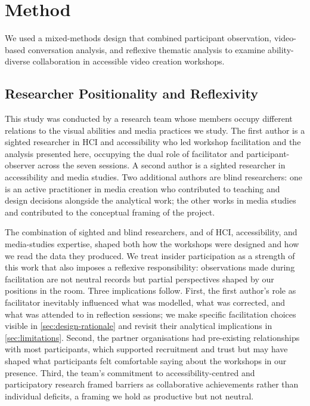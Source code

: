 \section{Method}
We used a mixed-methods design that combined participant observation, video-based conversation analysis, and reflexive thematic analysis to examine ability-diverse collaboration in accessible video creation workshops.

\subsection{Researcher Positionality and Reflexivity}
\label{sec:positionality}
This study was conducted by a research team whose members occupy different relations to the visual abilities and media practices we study. The first author is a sighted researcher in HCI and accessibility who led workshop facilitation and the analysis presented here, occupying the dual role of facilitator and participant-observer across the seven sessions. A second author is a sighted researcher in accessibility and media studies. Two additional authors are blind researchers: one is an active practitioner in media creation who contributed to teaching and design decisions alongside the analytical work; the other works in media studies and contributed to the conceptual framing of the project.

The combination of sighted and blind researchers, and of HCI, accessibility, and media-studies expertise, shaped both how the workshops were designed and how we read the data they produced. We treat insider participation as a strength of this work that also imposes a reflexive responsibility: observations made during facilitation are not neutral records but partial perspectives shaped by our positions in the room. Three implications follow. First, the first author's role as facilitator inevitably influenced what was modelled, what was corrected, and what was attended to in reflection sessions; we make specific facilitation choices visible in \autoref{sec:design-rationale} and revisit their analytical implications in \autoref{sec:limitations}. Second, the partner organisations had pre-existing relationships with most participants, which supported recruitment and trust but may have shaped what participants felt comfortable saying about the workshops in our presence. Third, the team's commitment to accessibility-centred and participatory research framed barriers as collaborative achievements rather than individual deficits, a framing we hold as productive but not neutral.

